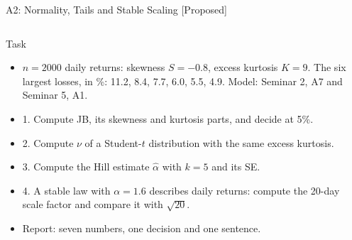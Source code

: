 \begin{frame}{A2: Normality, Tails and Stable Scaling [Proposed]}
\propsub
\itemsize{\scriptsize}
\begin{columns}[T]
\begin{column}{\taskw}
\begin{block}{Task}
\begin{itemize}
    \item $n = 2000$ daily returns: skewness $S = -0.8$, excess kurtosis $K = 9$. The six largest losses, in \%: 11.2, 8.4, 7.7, 6.0, 5.5, 4.9. Model: Seminar 2, A7 and Seminar 5, A1.
    \item 1. Compute JB, its skewness and kurtosis parts, and decide at 5\%.
    \item 2. Compute $\nu$ of a Student-$t$ distribution with the same excess kurtosis.
    \item 3. Compute the Hill estimate $\hat\alpha$ with $k = 5$ and its SE.
    \item 4. A stable law with $\alpha = 1.6$ describes daily returns: compute the 20-day scale factor and compare it with $\sqrt{20}$.
    \item Report: seven numbers, one decision and one sentence.
\end{itemize}
\end{block}
\end{column}
\begin{column}{\solw}
\end{column}
\end{columns}
\end{frame}

